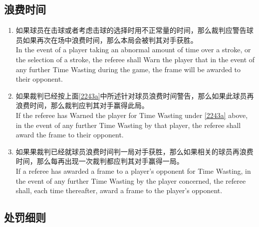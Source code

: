 \subsection{浪费时间}\label{2243}

\begin{enumerate}[label=(\alph*)]
    \item \label{2243a}如果球员在击球或者考虑击球的选择时用不正常量的时间，那么裁判应警告球员如果再次在场中浪费时间，那么本局会被判其对手获胜。\\
    In the event of a player taking an abnormal amount of time over a stroke, or the selection of a stroke, the referee shall Warn the player that in the event of any further Time Wasting during the game, the frame will be awarded to their opponent.
    \item \label{2243b}如果裁判已经按上面\ref{2243a}中所述针对球员浪费时间警告，那么如果此球员再浪费时间，那么裁判应判其对手赢得此局。\\
    If the referee has Warned the player for Time Wasting under \ref{2243a} above, in the event of any further Time Wasting by that player, the referee shall award the frame to their opponent.
    \item \label{2243c}如果果裁判已经就球员浪费时间判一局对手获胜，那么如果相关的球员再浪费时间，那么每再出现一次裁判都应判其对手赢得一局。\\
    If a referee has awarded a frame to a player's opponent for Time Wasting, in the event of any further Time Wasting by the player concerned, the referee shall, each time thereafter, award a frame to the player's opponent.
\end{enumerate}

\subsection{处罚细则}

